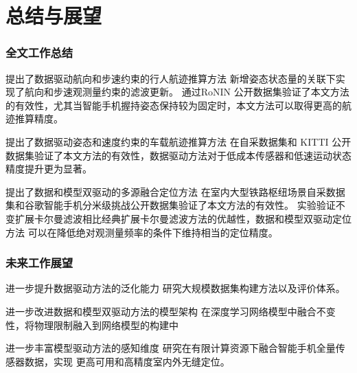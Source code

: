 

\section{总结与展望}

\begin{frame}
	\frametitle{全文工作总结}	
		\begin{block}{提出了数据驱动航向和步速约束的行人航迹推算方法}
		{   
		    \footnotesize
		    新增姿态状态量的关联下实现了航向和步速观测量约束的滤波更新。
		    通过RoNIN 公开数据集验证了本文方法的有效性，尤其当智能手机握持姿态保持较为固定时，本文方法可以取得更高的航迹推算精度。
		} 
		\end{block}
		
		\begin{block}{提出了数据驱动姿态和速度约束的车载航迹推算方法}
		{
		    \footnotesize
		    在自采数据集和 KITTI 公开数据集验证了本文方法的有效性，数据驱动方法对于低成本传感器和低速运动状态精度提升更为显著。
		} 
		\end{block}
		
		\begin{block}{提出了数据和模型双驱动的多源融合定位方法}
		{
		    \footnotesize
		    在室内大型铁路枢纽场景自采数据集和谷歌智能手机分米级挑战公开数据集验证了本文方法的有效性。
		    实验验证不变扩展卡尔曼滤波相比经典扩展卡尔曼滤波方法的优越性，数据和模型双驱动定位方法 可以在降低绝对观测量频率的条件下维持相当的定位精度。
		} 
		\end{block}
\end{frame}


\begin{frame}
	\frametitle{未来工作展望}
		\begin{block}{进一步提升数据驱动方法的泛化能力}
		{   
		    \footnotesize
		    研究大规模数据集构建方法以及评价体系。
		} 
		\end{block}
		
		\begin{block}{进一步改进数据和模型双驱动方法的模型架构}
		{
		    \footnotesize
		    在深度学习网络模型中融合不变性，将物理限制融入到网络模型的构建中
		} 
		\end{block}
		
		\begin{block}{进一步丰富模型驱动方法的感知维度}
		{
		    \footnotesize
		    研究在有限计算资源下融合智能手机全量传感器数据，实现 更高可用和高精度室内外无缝定位。
		} 
		\end{block}
\end{frame}
